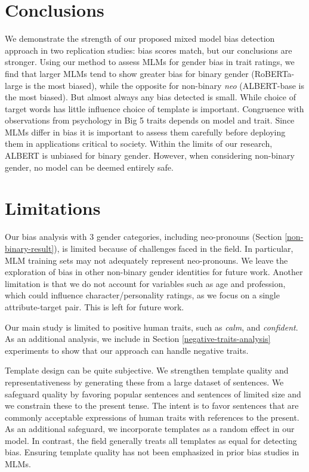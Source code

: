 \section{Conclusions}

\noindent 
We demonstrate the strength of our proposed mixed model bias detection approach in two  
replication studies: bias scores match, but our conclusions are stronger.
%
Using our method to assess MLMs for gender bias in trait ratings, we find that larger MLMs tend to show greater bias for binary gender (RoBERTa-large is the most biased), while the opposite for non-binary \textit{neo} (ALBERT-base is the most biased).
%
But almost always any bias detected is small. While choice of target words has little influence choice of template is important. Congruence with observations from psychology in Big 5 traits depends on model and trait.
Since MLMs differ in bias it is important to assess them carefully before deploying them in applications critical to society. Within the limits of our research, ALBERT is unbiased for binary gender. However, when considering non-binary gender, no model can be deemed entirely safe.

\section{Limitations}

\noindent Our bias analysis with  3 gender categories, including neo-pronouns (Section \ref{non-binary-result}), is limited because of challenges faced in the field.  
In particular, MLM training sets may not adequately represent neo-pronouns. We leave the exploration of bias in other non-binary gender identities for future work.
%
Another limitation is that we do not account for variables such as age and profession, which could influence character/personality ratings, as we focus on a single attribute-target pair. This is left for future work.
%

Our main study is limited to positive human traits, such as \textit{calm}, and \textit{confident}.
%
As an additional analysis, we include in Section \ref{negative-traits-analysis} experiments to show that our approach can handle negative traits. 

Template design can be quite subjective.
We strengthen template quality and representativeness by generating these from a large dataset of sentences.
We safeguard quality by favoring popular sentences and sentences of limited size and we constrain these to the present tense.  
The intent is to favor sentences that are commonly acceptable expressions of human traits with references to the present.
%
As an additional safeguard, we incorporate templates as a random effect in our model. 
In contrast, the field generally treats all templates as equal for detecting bias.
Ensuring template quality has not been emphasized in prior bias studies in MLMs.
%

